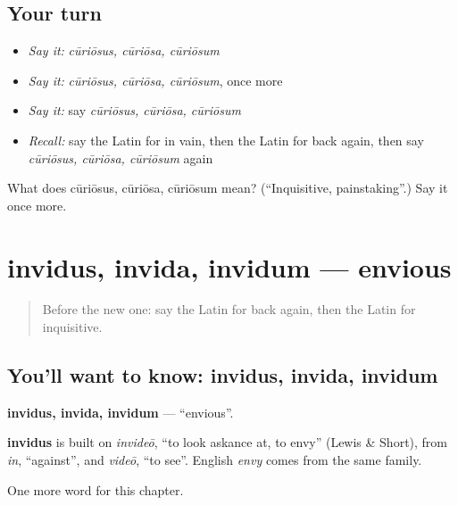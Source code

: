 \subsection*{Your turn}
\begin{itemize}
\raggedright
  \item \emph{Say it:} \emph{cūriōsus, cūriōsa, cūriōsum}
  \item \emph{Say it:} \emph{cūriōsus, cūriōsa, cūriōsum}, once more
  \item \emph{Say it:} say \emph{cūriōsus, cūriōsa, cūriōsum}
  \item \emph{Recall:} say the Latin for in vain, then the Latin for back again, then say \emph{cūriōsus, cūriōsa, cūriōsum} again
\end{itemize}

\begin{tcolorbox}[breakable,colback=teal!4,colframe=teal!35!black,title={Before you move on}]
What does cūriōsus, cūriōsa, cūriōsum mean? (\textquotedblleft{}Inquisitive, painstaking\textquotedblright{}.) Say it once more.
\end{tcolorbox}
\section[invidus, invida, invidum]{invidus, invida, invidum — envious}

\label{lesson:LA-C212-invidus}



\begin{quote}
Before the new one: say the Latin for back again, then the Latin for inquisitive.
\end{quote}

\subsection*{You'll want to know: invidus, invida, invidum}
\textbf{invidus, invida, invidum} — \textquotedblleft{}envious\textquotedblright{}.

\begin{cousinweb}
\textbf{invidus} is built on \emph{invideō}, \textquotedblleft{}to look askance at, to envy\textquotedblright{} (Lewis \& Short), from \emph{in}, \textquotedblleft{}against\textquotedblright{}, and \emph{videō}, \textquotedblleft{}to see\textquotedblright{}. English \emph{envy} comes from the same family.
\end{cousinweb}

\begin{grammarlens}[title={What you've built}]
One more word for this chapter.
\end{grammarlens}

